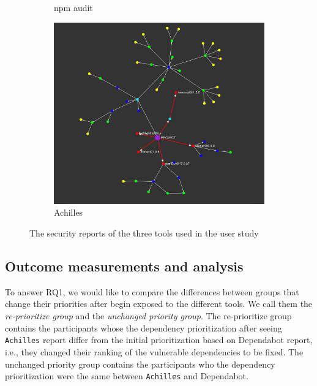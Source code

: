 \documentclass[conference]{IEEEtran}
\begin{document}
\begin{figure}
\begin{subfigure}[b]{0.32\textwidth}
			\caption{npm audit}
			\label{fig:screenshot-npm-audit}
		\end{subfigure}
		\hfill
		\begin{subfigure}[b]{0.32\textwidth}
			\centering
			\includegraphics[width=\textwidth]{Figures/screenshot-achilles.png}
			\caption{Achilles}
			\label{fig:screenshot-achilles}
		\end{subfigure}
		\caption{The security reports of the three tools used in the user study}
		\label{fig:screenshots}
	\end{figure}
		
	\subsection{Outcome measurements and analysis}

To answer RQ1, we would like to compare the differences between groups that change their priorities after begin exposed to the different tools. 
 We call them the \textit{re-prioritize group} and the \textit{unchanged priority group}. 
 The re-prioritize group contains the participants whose the dependency prioritization after seeing \texttt{Achilles} report differ from the  initial prioritization based on Dependabot report, i.e., they changed their ranking of the vulnerable dependencies to be fixed. 
 The unchanged priority group contains the participants who the dependency prioritization were the same between \texttt{Achilles} and Dependabot.
 
\end{document}
